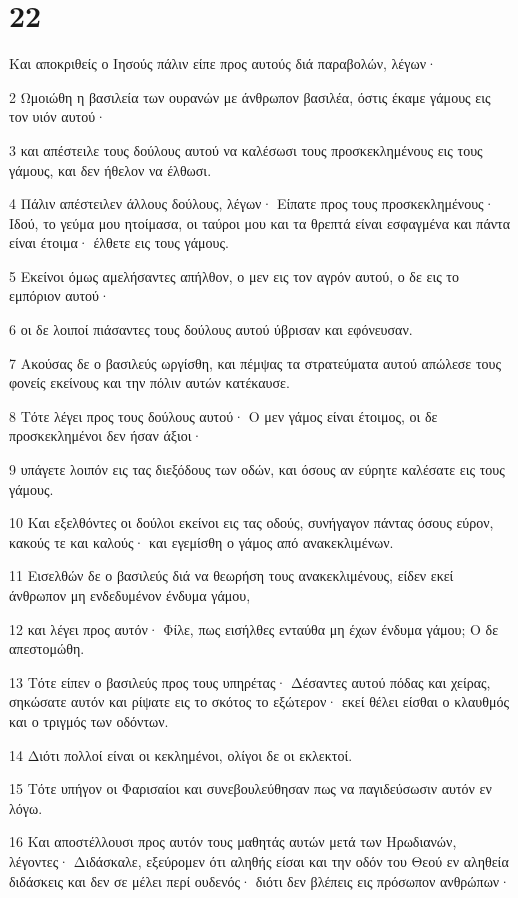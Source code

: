 \chapter{22}

\par Και αποκριθείς ο Ιησούς πάλιν είπε προς αυτούς διά παραβολών, λέγων·
\par 2 Ωμοιώθη η βασιλεία των ουρανών με άνθρωπον βασιλέα, όστις έκαμε γάμους εις τον υιόν αυτού·
\par 3 και απέστειλε τους δούλους αυτού να καλέσωσι τους προσκεκλημένους εις τους γάμους, και δεν ήθελον να έλθωσι.
\par 4 Πάλιν απέστειλεν άλλους δούλους, λέγων· Είπατε προς τους προσκεκλημένους· Ιδού, το γεύμα μου ητοίμασα, οι ταύροι μου και τα θρεπτά είναι εσφαγμένα και πάντα είναι έτοιμα· έλθετε εις τους γάμους.
\par 5 Εκείνοι όμως αμελήσαντες απήλθον, ο μεν εις τον αγρόν αυτού, ο δε εις το εμπόριον αυτού·
\par 6 οι δε λοιποί πιάσαντες τους δούλους αυτού ύβρισαν και εφόνευσαν.
\par 7 Ακούσας δε ο βασιλεύς ωργίσθη, και πέμψας τα στρατεύματα αυτού απώλεσε τους φονείς εκείνους και την πόλιν αυτών κατέκαυσε.
\par 8 Τότε λέγει προς τους δούλους αυτού· Ο μεν γάμος είναι έτοιμος, οι δε προσκεκλημένοι δεν ήσαν άξιοι·
\par 9 υπάγετε λοιπόν εις τας διεξόδους των οδών, και όσους αν εύρητε καλέσατε εις τους γάμους.
\par 10 Και εξελθόντες οι δούλοι εκείνοι εις τας οδούς, συνήγαγον πάντας όσους εύρον, κακούς τε και καλούς· και εγεμίσθη ο γάμος από ανακεκλιμένων.
\par 11 Εισελθών δε ο βασιλεύς διά να θεωρήση τους ανακεκλιμένους, είδεν εκεί άνθρωπον μη ενδεδυμένον ένδυμα γάμου,
\par 12 και λέγει προς αυτόν· Φίλε, πως εισήλθες ενταύθα μη έχων ένδυμα γάμου; Ο δε απεστομώθη.
\par 13 Τότε είπεν ο βασιλεύς προς τους υπηρέτας· Δέσαντες αυτού πόδας και χείρας, σηκώσατε αυτόν και ρίψατε εις το σκότος το εξώτερον· εκεί θέλει είσθαι ο κλαυθμός και ο τριγμός των οδόντων.
\par 14 Διότι πολλοί είναι οι κεκλημένοι, ολίγοι δε οι εκλεκτοί.
\par 15 Τότε υπήγον οι Φαρισαίοι και συνεβουλεύθησαν πως να παγιδεύσωσιν αυτόν εν λόγω.
\par 16 Και αποστέλλουσι προς αυτόν τους μαθητάς αυτών μετά των Ηρωδιανών, λέγοντες· Διδάσκαλε, εξεύρομεν ότι αληθής είσαι και την οδόν του Θεού εν αληθεία διδάσκεις και δεν σε μέλει περί ουδενός· διότι δεν βλέπεις εις πρόσωπον ανθρώπων·
